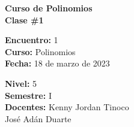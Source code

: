\begin{center} \textbf
{
    \Large Curso de Polinomios \\ \vspace{2mm}Clase \#1
}
\end{center}

\begin{multicols}{2}
{
    \textbf{Encuentro:} 1\\
    \textbf{Curso:} Polinomios\\
    \textbf{Fecha:} 18 de marzo de 2023\\
    \begin{flushright}
        \textbf{Nivel:} 5\\
        \textbf{Semestre:} I\\
        \textbf{Docentes:} Kenny Jordan Tinoco \\José Adán Duarte
    \end{flushright}
}
\end{multicols}

\thispagestyle{first-page-style}